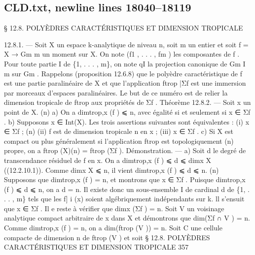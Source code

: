 \documentclass[
  10pt,
]{article}
\newenvironment{Shaded}{}{}
\newcommand{\NormalTok}[1]{#1}
\begin{document}
\subsection{CLD.txt, newline lines
18040--18119}\label{cld.txt-newline-lines-1804018119}

\begin{Shaded}
\begin{Highlighting}[]
\NormalTok{      § 12.8. POLYÈDRES CARACTÉRISTIQUES ET DIMENSION}
\NormalTok{                            TROPICALE}

\NormalTok{12.8.1. — Soit X un espace k{-}analytique de niveau n, soit m un entier et soit f =}
\NormalTok{X → Gm   m un moment sur X. On note (f1 , . . . , fm ) les composantes de f . Pour toute}
\NormalTok{partie I de \{1, . . . , m\}, on note qI la projection canonique de Gm      I}
\NormalTok{                                                                   m sur Gm .}
\NormalTok{  Rappelons (proposition 12.6.8) que le polyèdre caractéristique de f est une partie}
\NormalTok{paralinéaire de X et que l’application ftrop |Σf est une immersion par morceaux d’espaces}
\NormalTok{paralinéaires.}
\NormalTok{  Le but de ce numéro est de relier la dimension tropicale de ftrop aux propriétés de Σf .}
\NormalTok{Théorème 12.8.2. — Soit x un point de X.}
\NormalTok{                                                                    (n)}
\NormalTok{   a) On a dimtrop,x (f ) ⩽ n, avec égalité si et seulement si x ∈ Σf .}
\NormalTok{   b) Supposons x ∈ Int(X). Les trois assertions suivantes sont équivalentes : (i) x ∈ Σf ;}
\NormalTok{                                                        (n)}
\NormalTok{(ii) f est de dimension tropicale n en x ; (iii) x ∈ Σf .}
\NormalTok{   c) Si X est compact ou plus généralement si l’application ftrop est topologiquement}
\NormalTok{                                    (n)}
\NormalTok{propre, on a ftrop (X)(n) = ftrop (Σf ).}
\NormalTok{Démonstration. — a) Soit d le degré de transcendance résiduel de f en x. On a}
\NormalTok{dimtrop,x (f ) ⩽ d ⩽ dimx X ((12.2.10.1)). Comme dimx X ⩽ n, il vient dimtrop,x (f ) ⩽}
\NormalTok{d ⩽ n.}
\NormalTok{                                                              (n)}
\NormalTok{   Supposons que dimtrop,x (f ) = n, et montrons que x ∈ Σf . Puisque dimtrop,x (f ) ⩽}
\NormalTok{d ⩽ n, on a d = n. Il existe donc un sous{-}ensemble I de cardinal d de \{1, . . . , m\}}
\NormalTok{tels que les f] i (x) soient algébriquement indépendants sur k. ll s’ensuit que x ∈ Σf . Il}
\NormalTok{                                                             e}
\NormalTok{reste à vérifier que dimx (Σf ) = n. Soit V un voisinage analytique compact arbitraire}
\NormalTok{de x dans X et démontrons que dim(Σf ∩ V ) = n. Comme dimtrop,x (f ) = n, on a}
\NormalTok{dim(ftrop (V )) = n. Soit C une cellule compacte de dimension n de ftrop (V ) et soit}
\NormalTok{             § 12.8. POLYÈDRES CARACTÉRISTIQUES ET DIMENSION TROPICALE                     357}


\end{Highlighting}
\end{Shaded}
\end{document}
